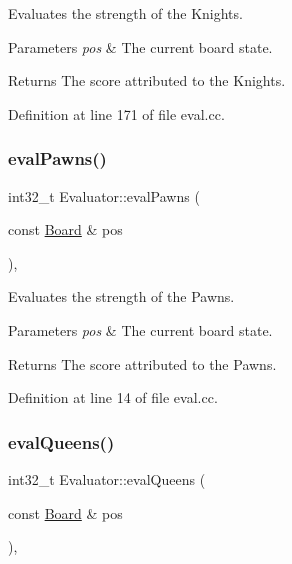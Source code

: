Evaluates the strength of the Knights. 


\begin{DoxyParams}{Parameters}
{\em pos} & The current board state. \\
\hline
\end{DoxyParams}
\begin{DoxyReturn}{Returns}
The score attributed to the Knights. 
\end{DoxyReturn}


Definition at line 171 of file eval.\+cc.

\mbox{\label{classEvaluator_a76e81d148449a9bb6c1616895223ad77}} 
\subsubsection{\texorpdfstring{eval\+Pawns()}{evalPawns()}}
{\footnotesize\ttfamily int32\+\_\+t Evaluator\+::eval\+Pawns (\begin{DoxyParamCaption}\item[{const \mbox{\hyperlink{classBoard}{Board}} \&}]{pos }\end{DoxyParamCaption})\hspace{0.3cm}{\ttfamily [private]}, {\ttfamily [noexcept]}}



Evaluates the strength of the Pawns. 


\begin{DoxyParams}{Parameters}
{\em pos} & The current board state. \\
\hline
\end{DoxyParams}
\begin{DoxyReturn}{Returns}
The score attributed to the Pawns. 
\end{DoxyReturn}


Definition at line 14 of file eval.\+cc.

\mbox{\label{classEvaluator_a322d577548dd00c32e949cad62a17393}} 
\subsubsection{\texorpdfstring{eval\+Queens()}{evalQueens()}}
{\footnotesize\ttfamily int32\+\_\+t Evaluator\+::eval\+Queens (\begin{DoxyParamCaption}\item[{const \mbox{\hyperlink{classBoard}{Board}} \&}]{pos }\end{DoxyParamCaption})\hspace{0.3cm}{\ttfamily [private]}, {\ttfamily [noexcept]}}



